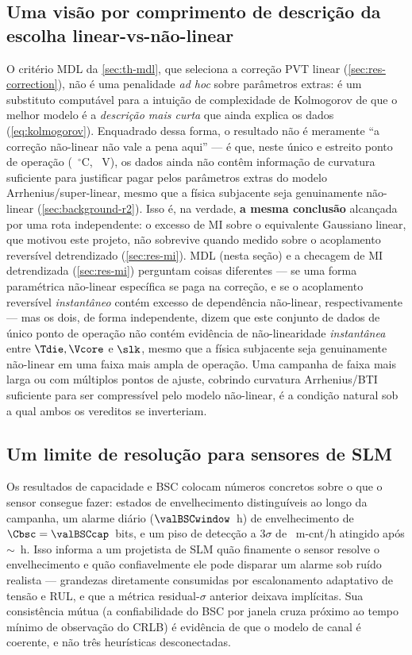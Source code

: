 \subsection{Uma visão por comprimento de descrição da escolha linear-vs-não-linear}
O critério MDL da \cref{sec:th-mdl}, que seleciona a correção PVT linear
(\cref{sec:res-correction}), não é uma penalidade \emph{ad hoc} sobre
parâmetros extras: é um substituto computável para a intuição de
complexidade de Kolmogorov de que o melhor modelo é a \emph{descrição mais
curta} que ainda explica os dados (\cref{eq:kolmogorov}). Enquadrado dessa
forma, o resultado não é meramente ``a correção não-linear não vale a pena
aqui'' --- é que, neste único e estreito ponto de operação
(\valDutTempMean~$^\circ$C, \valDutVoltMean~V), os dados ainda não contêm
informação de curvatura suficiente para justificar pagar pelos parâmetros
extras do modelo Arrhenius/super-linear, mesmo que a física subjacente seja
genuinamente não-linear (\cref{sec:background-r2}). Isso é, na verdade,
\textbf{a mesma conclusão} alcançada por uma rota independente: o excesso
de MI sobre o equivalente Gaussiano linear, que motivou este projeto, não
sobrevive quando medido sobre o acoplamento reversível detrendizado
(\cref{sec:res-mi}). MDL (nesta seção) e a checagem de MI detrendizada
(\cref{sec:res-mi}) perguntam coisas diferentes --- se uma forma paramétrica
não-linear específica se paga na correção, e se o acoplamento reversível
\emph{instantâneo} contém excesso de dependência não-linear, respectivamente
--- mas os dois, de forma independente, dizem que este conjunto de dados de
único ponto de operação não contém evidência de não-linearidade
\emph{instantânea} entre $\Tdie,\Vcore$ e $\slk$, mesmo que a física
subjacente seja genuinamente não-linear em uma faixa mais ampla de operação.
Uma campanha de faixa mais larga ou com múltiplos pontos de ajuste, cobrindo
curvatura Arrhenius/BTI suficiente para ser compressível pelo modelo
não-linear, é a condição natural sob a qual ambos os vereditos se
inverteriam.

\subsection{Um limite de resolução para sensores de SLM}
Os resultados de capacidade e BSC colocam números concretos sobre o que o
sensor consegue fazer: \valCapacityStates{} estados de envelhecimento
distinguíveis ao longo da campanha, um alarme diário
($\valBSCwindow$~h) de envelhecimento de $\Cbsc=\valBSCcap$~bits, e um piso
de detecção a $3\sigma$ de \valMinDetectRate~m-cnt/h atingido após
$\sim$\valMinObsTime~h. Isso informa a um projetista de SLM quão finamente o
sensor resolve o envelhecimento e quão confiavelmente ele pode disparar um
alarme sob ruído realista --- grandezas diretamente consumidas por
escalonamento adaptativo de tensão e RUL, e que a métrica residual-$\sigma$
anterior deixava implícitas. Sua consistência mútua (a confiabilidade do
BSC por janela cruza próximo ao tempo mínimo de observação do CRLB) é
evidência de que o modelo de canal é coerente, e não três heurísticas
desconectadas.

